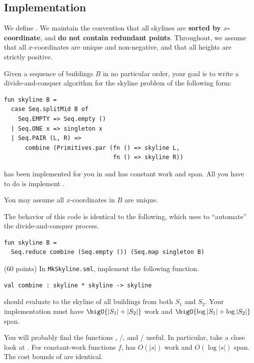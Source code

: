 \subsection{Implementation}

We define . We maintain the convention
that all skylines are \textbf{sorted by $x$-coordinate}, and \textbf{do not
contain redundant points}. Throughout, we assume that all $x$-coordinates are
unique and non-negative, and that all heights are strictly positive.

Given a sequence of buildings $B$ in no particular order, your goal is to write
a divide-and-conquer algorithm for the skyline problem of the following form:
\begin{verbatim}
fun skyline B =
  case Seq.splitMid B of
    Seq.EMPTY => Seq.empty ()
  | Seq.ONE x => singleton x
  | Seq.PAIR (L, R) =>
      combine (Primitives.par (fn () => skyline L,
                               fn () => skyline R))
\end{verbatim}
 has been implemented for you in  and has
constant work and span. All you have to do is implement .

\begin{note}
You may assume all $x$-coordinates in $B$ are unique.
\end{note}

\begin{remark}
The behavior of this code is identical to the following, which uses
 to ``automate'' the divide-and-conquer process.
\begin{verbatim}
fun skyline B =
  Seq.reduce combine (Seq.empty ()) (Seq.map singleton B)
\end{verbatim}
\end{remark}

\begin{task}[1]
\label{task:skylinelab:1}
(60 points)
In \texttt{MkSkyline.sml}, implement the following function.
\begin{verbatim}
val combine : skyline * skyline -> skyline
\end{verbatim}
 should evaluate to the skyline of all buildings
from both $S_1$ and $S_2$. Your implementation must have $\bigO {|S_1| + |S_2|}$ work
and $\bigO {\log|S_1| + \log|S_2|}$ span.
\end{task}

\begin{hint}
You will probably find the functions ,
/, and /
useful. In particular, take a close look at .
For constant-work functions $f$,  has $O(|s|)$ work and
$O(\log|s|)$ span. The cost bounds of  are identical.
\end{hint}

